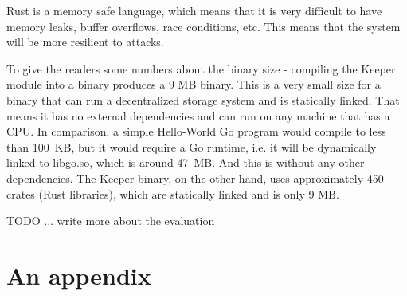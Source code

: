 \documentclass[ twoside,openright,titlepage,numbers=noenddot,headinclude,%
                footinclude=true,cleardoublepage=empty,abstractoff, %
                BCOR=5mm,paper=a4,fontsize=11pt,%
                ngerman,american,%
                ]{scrreprt}
\begin{document}
Rust is a memory safe language, which means that it is very difficult to have memory leaks,
buffer overflows, race conditions, etc.
This means that the system will be more resilient to attacks.

To give the readers some numbers about the binary size - compiling
the Keeper module into a binary produces a 9 MB binary.
This is a very small size for a binary that can run a decentralized storage system and is statically linked.
That means it has no external dependencies and can run on any machine that has a CPU.
In comparison, a simple Hello-World Go program would compile to less than 100 KB,
but it would require a Go runtime, i.e. it will be dynamically linked to libgo.so, which is around 47 MB.
And this is without any other dependencies.
The Keeper binary, on the other hand, uses approximately 450 crates (Rust libraries),
which are statically linked and is only 9 MB.

TODO ... write more about the evaluation


\appendix
\chapter{An appendix}
\label{cha:an-appendix}

\printbibliography
\end{document}
